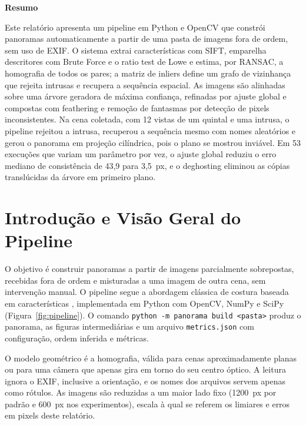 \documentclass[10pt,a4paper]{article}
\begin{document}
\begin{center}\textbf{\large Resumo}\end{center}
\vspace{-6pt}
Este relatório apresenta um pipeline em Python e OpenCV que constrói panoramas automaticamente a partir
de uma pasta de imagens fora de ordem, sem uso de EXIF. O sistema extrai características com SIFT,
emparelha descritores com Brute Force e o ratio test de Lowe e estima, por RANSAC, a homografia de todos
os pares; a matriz de inliers define um grafo de vizinhança que rejeita intrusas e recupera a sequência
espacial. As imagens são alinhadas sobre uma árvore geradora de máxima confiança, refinadas por ajuste
global e compostas com feathering e remoção de fantasmas por detecção de pixels inconsistentes. Na cena
coletada, com 12 vistas de um quintal e uma intrusa, o pipeline rejeitou a intrusa, recuperou a sequência
mesmo com nomes aleatórios e gerou o panorama em projeção cilíndrica, pois o plano se mostrou inviável. Em
53 execuções que variam um parâmetro por vez, o ajuste global reduziu o erro mediano de consistência de
43,9 para 3,5~px, e o deghosting eliminou as cópias translúcidas da árvore em primeiro plano.

\section{Introdução e Visão Geral do Pipeline}
O objetivo é construir panoramas a partir de imagens parcialmente sobrepostas, recebidas fora de ordem e
misturadas a uma imagem de outra cena, sem intervenção manual. O pipeline segue a abordagem clássica de
costura baseada em características \cite{brown2007,szeliski2022}, implementada em Python com OpenCV,
NumPy e SciPy (Figura~\ref{fig:pipeline}). O comando \texttt{python -m panorama build <pasta>} produz o
panorama, as figuras intermediárias e um arquivo \texttt{metrics.json} com configuração, ordem inferida e
métricas.

O modelo geométrico é a homografia, válida para cenas aproximadamente planas ou para uma câmera que apenas
gira em torno do seu centro óptico. A leitura ignora o EXIF, inclusive a orientação, e os nomes dos
arquivos servem apenas como rótulos. As imagens são reduzidas a um maior lado fixo (1200~px por padrão e
600~px nos experimentos), escala à qual se referem os limiares e erros em pixels deste relatório.
\end{document}
